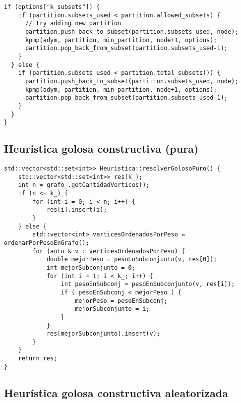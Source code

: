 \begin{lstlisting}[frame=single]
  if (options["k_subsets"]) {
    if (partition.subsets_used < partition.allowed_subsets) {
      // try adding new partition
      partition.push_back_to_subset(partition.subsets_used, node);
      kpmp(adym, partition, min_partition, node+1, options);
      partition.pop_back_from_subset(partition.subsets_used-1);
    }
  } else {
    if (partition.subsets_used < partition.total_subsets()) {
      partition.push_back_to_subset(partition.subsets_used, node);
      kpmp(adym, partition, min_partition, node+1, options);
      partition.pop_back_from_subset(partition.subsets_used-1);
    }
  }
}
\end{lstlisting}

\newpage

\subsection{Heurística golosa constructiva (pura)}

\begin{lstlisting}[frame=single]
std::vector<std::set<int>> Heuristica::resolverGolosoPuro() {
    std::vector<std::set<int>> res(k_);
    int n = grafo_.getCantidadVertices();
    if (n <= k_) {
        for (int i = 0; i < n; i++) {
            res[i].insert(i);
        }
    } else {
        std::vector<int> verticesOrdenadosPorPeso = ordenarPorPesoEnGrafo();
        for (auto & v : verticesOrdenadosPorPeso) {
            double mejorPeso = pesoEnSubconjunto(v, res[0]);
            int mejorSubconjunto = 0;
            for (int i = 1; i < k_; i++) {
                int pesoEnSubconj = pesoEnSubconjunto(v, res[i]);
                if ( pesoEnSubconj < mejorPeso ) {
                    mejorPeso = pesoEnSubconj;
                    mejorSubconjunto = i;
                }
            }
            res[mejorSubconjunto].insert(v);
        }
    }
    return res;
}
\end{lstlisting}

\newpage

\subsection{Heurística golosa constructiva aleatorizada}

